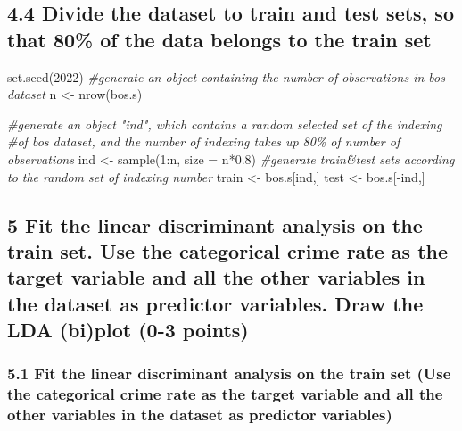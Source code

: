 \documentclass[
]{article}
\newenvironment{Shaded}{\begin{snugshade}}{\end{snugshade}}
\newcommand{\AttributeTok}[1]{\textcolor[rgb]{0.77,0.63,0.00}{#1}}
\newcommand{\CommentTok}[1]{\textcolor[rgb]{0.56,0.35,0.01}{\textit{#1}}}
\newcommand{\DecValTok}[1]{\textcolor[rgb]{0.00,0.00,0.81}{#1}}
\newcommand{\FloatTok}[1]{\textcolor[rgb]{0.00,0.00,0.81}{#1}}
\newcommand{\FunctionTok}[1]{\textcolor[rgb]{0.00,0.00,0.00}{#1}}
\newcommand{\NormalTok}[1]{#1}
\newcommand{\OtherTok}[1]{\textcolor[rgb]{0.56,0.35,0.01}{#1}}
\newcommand{\SpecialCharTok}[1]{\textcolor[rgb]{0.00,0.00,0.00}{#1}}
\begin{document}
\hypertarget{divide-the-dataset-to-train-and-test-sets-so-that-80-of-the-data-belongs-to-the-train-set}{%
\subsection{4.4 Divide the dataset to train and test sets, so that 80\%
of the data belongs to the train
set}\label{divide-the-dataset-to-train-and-test-sets-so-that-80-of-the-data-belongs-to-the-train-set}}

\begin{Shaded}
\begin{Highlighting}[]
\FunctionTok{set.seed}\NormalTok{(}\DecValTok{2022}\NormalTok{) }
\CommentTok{\#generate an object containing the number of observations in bos dataset}
\NormalTok{n }\OtherTok{\textless{}{-}}  \FunctionTok{nrow}\NormalTok{(bos.s)}

\CommentTok{\#generate an object "ind", which contains a random selected set of the indexing }
\CommentTok{\#of bos dataset, and the number of indexing takes up 80\% of number of observations}
\NormalTok{ind }\OtherTok{\textless{}{-}} \FunctionTok{sample}\NormalTok{(}\DecValTok{1}\SpecialCharTok{:}\NormalTok{n, }\AttributeTok{size =}\NormalTok{ n}\SpecialCharTok{*}\FloatTok{0.8}\NormalTok{)}
\CommentTok{\#generate train\&test sets according to the random set of indexing number}
\NormalTok{train }\OtherTok{\textless{}{-}}\NormalTok{ bos.s[ind,]}
\NormalTok{test }\OtherTok{\textless{}{-}}\NormalTok{ bos.s[}\SpecialCharTok{{-}}\NormalTok{ind,]}
\end{Highlighting}
\end{Shaded}

\hypertarget{fit-the-linear-discriminant-analysis-on-the-train-set.-use-the-categorical-crime-rate-as-the-target-variable-and-all-the-other-variables-in-the-dataset-as-predictor-variables.-draw-the-lda-biplot-0-3-points}{%
\subsection{5 Fit the linear discriminant analysis on the train set. Use
the categorical crime rate as the target variable and all the other
variables in the dataset as predictor variables. Draw the LDA (bi)plot
(0-3
points)}\label{fit-the-linear-discriminant-analysis-on-the-train-set.-use-the-categorical-crime-rate-as-the-target-variable-and-all-the-other-variables-in-the-dataset-as-predictor-variables.-draw-the-lda-biplot-0-3-points}}

\hypertarget{fit-the-linear-discriminant-analysis-on-the-train-set-use-the-categorical-crime-rate-as-the-target-variable-and-all-the-other-variables-in-the-dataset-as-predictor-variables}{%
\subsubsection{5.1 Fit the linear discriminant analysis on the train set
(Use the categorical crime rate as the target variable and all the other
variables in the dataset as predictor
variables)}\label{fit-the-linear-discriminant-analysis-on-the-train-set-use-the-categorical-crime-rate-as-the-target-variable-and-all-the-other-variables-in-the-dataset-as-predictor-variables}}
\end{document}
